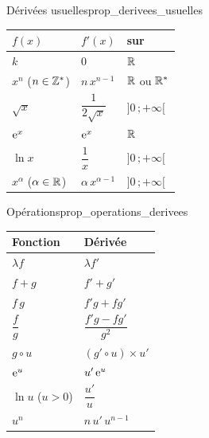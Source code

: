 \begin{propriete}{Dérivées usuelles}{prop_derivees_usuelles}
	\begin{center}
	\renewcommand{\arraystretch}{1.7}
	\begin{tabular}{>{\centering\arraybackslash}p{2.6cm}
	                >{\centering\arraybackslash}p{2.6cm}
	                >{\centering\arraybackslash}p{2.7cm}}
	\hline
	$f(x)$ & $f'(x)$ & sur \\
	\hline
	$k$                 & $0$                    & $\mathbb{R}$ \\
	$x^{n}$ ($n\in\mathbb{Z}^*$) & $n\,x^{n-1}$          & $\mathbb{R}$ ou $\mathbb{R}^*$ \\
	$\sqrt{x}$          & $\dfrac{1}{2\sqrt{x}}$ & $]0\,;+\infty[$ \\
	$\mathrm{e}^{x}$            & $\mathrm{e}^{x}$               & $\mathbb{R}$ \\
	$\ln x$             & $\dfrac{1}{x}$         & $]0\,;+\infty[$ \\
	$x^{\alpha}$ ($\alpha\in\mathbb{R}$) & $\alpha\,x^{\alpha-1}$ & $]0\,;+\infty[$ \\
	\hline
	\end{tabular}
	\end{center}
\end{propriete}

\begin{propriete}{Opérations}{prop_operations_derivees}
	\begin{center}
	\renewcommand{\arraystretch}{1.7}
	\setlength{\tabcolsep}{5pt}
	\begin{tabular}{>{\centering\arraybackslash}p{3.4cm}
	                >{\centering\arraybackslash}p{4.6cm}}
	\hline
	Fonction & Dérivée \\
	\hline
	$\lambda f$        & $\lambda f'$ \\
	$f+g$              & $f'+g'$ \\
	$f\,g$             & $f'g+fg'$ \\
	$\dfrac{f}{g}$     & $\dfrac{f'g-fg'}{g^{2}}$ \\
	$g\circ u$         & $(g'\circ u)\times u'$ \\
	$\mathrm{e}^{u}$           & $u'\,\mathrm{e}^{u}$ \\
	$\ln u$ \; ($u>0$) & $\dfrac{u'}{u}$ \\
	$u^{n}$            & $n\,u'\,u^{n-1}$ \\
	\hline
	\end{tabular}
	\end{center}
\end{propriete}

